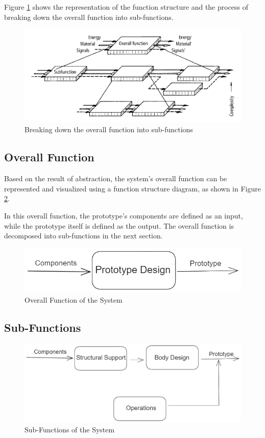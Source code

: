 Figure \ref{fig:subfunction-break} shows the representation of the function structure and the process of breaking down the overall function into sub-functions.

\begin{figure}[ht!]
    \centering
    \includegraphics[width=0.8\linewidth]{texs/Part1/chapter3/image/subfunctionbreak.png}
    \caption{Breaking down the overall function into sub-functions \cite[32]{Pahl2007}}
    \label{fig:subfunction-break}
\end{figure}


\subsection{Overall Function}
Based on the result of abstraction, the system's overall function can be represented and visualized using a function structure diagram, as shown in Figure \ref{fig:overall-function}.

In this overall function, the prototype's components are defined as an input, while the prototype itself is defined as the output. The overall function is decomposed into sub-functions in the next section.

\begin{figure}[ht!]
    \centering
    \includegraphics[width=0.5\linewidth]{texs/Part1/chapter3/image/overallfunction.png}
    \caption{Overall Function of the System}
    \label{fig:overall-function}
\end{figure}


\subsection{Sub-Functions}
\begin{figure}[ht!]
    \centering
    \includegraphics[width=0.8\linewidth]{texs/Part1/chapter3/image/subfunction1.png}
    \caption{Sub-Functions of the System}
    \label{fig:sub-functions}
\end{figure}

